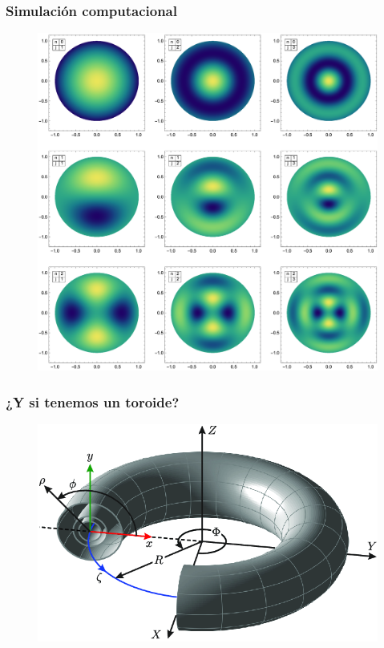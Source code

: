 \documentclass[12pt]{beamer}
\begin{document}
\begin{frame}
\frametitle{Simulación computacional}
\begin{figure}[h!]
    \centering
    \includegraphics[scale=0.32]{Imagenes/Modos_Vibracion_Membrana_Circular_01.eps}
\end{figure}
\end{frame}
\begin{frame}
\frametitle{¿Y si tenemos un toroide?}
\begin{figure}
    \centering
    \includegraphics[scale=0.4]{Imagenes/Geometria_Toro.png}
\end{figure}
\end{frame}
\end{document}
